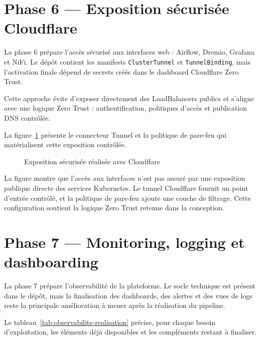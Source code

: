 \section{Phase 6 — Exposition sécurisée Cloudflare}

La phase 6 prépare l'accès sécurisé aux interfaces web : Airflow, Dremio, Grafana et NiFi. Le dépôt contient les manifests \texttt{ClusterTunnel} et \texttt{TunnelBinding}, mais l'activation finale dépend de secrets créés dans le dashboard Cloudflare Zero Trust.

Cette approche évite d'exposer directement des LoadBalancers publics et s'aligne avec une logique Zero Trust : authentification, politiques d'accès et publication DNS contrôlée.

La figure~\ref{fig:realisation-cloudflare} présente le connecteur Tunnel et la politique de pare-feu qui matérialisent cette exposition contrôlée.

\begin{figure}[H]
\centering
{}
\caption{Exposition sécurisée réalisée avec Cloudflare}
\label{fig:realisation-cloudflare}
\end{figure}

La figure montre que l'accès aux interfaces n'est pas assuré par une exposition publique directe des services Kubernetes. Le tunnel Cloudflare fournit un point d'entrée contrôlé, et la politique de pare-feu ajoute une couche de filtrage. Cette configuration soutient la logique Zero Trust retenue dans la conception.

\section{Phase 7 — Monitoring, logging et dashboarding}

La phase 7 prépare l'observabilité de la plateforme. Le socle technique est présent dans le dépôt, mais la finalisation des dashboards, des alertes et des vues de logs reste la principale amélioration à mener après la réalisation du pipeline.

Le tableau~\ref{tab:observabilite-realisation} précise, pour chaque besoin d'exploitation, les éléments déjà disponibles et les compléments restant à finaliser.


